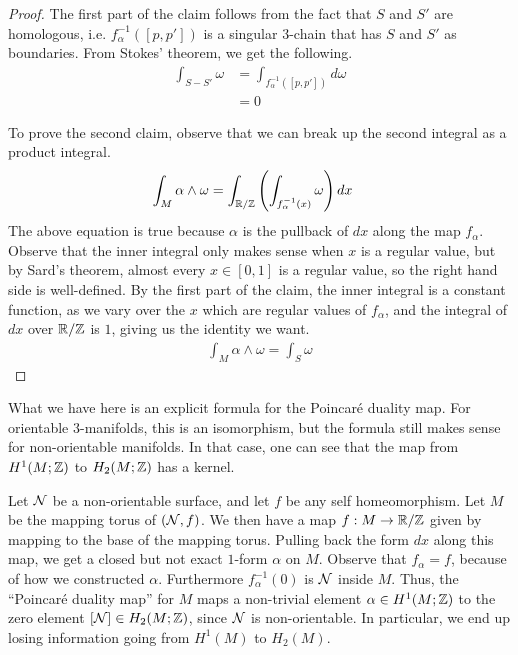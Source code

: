 \begin{proof}
  The first part of the claim follows from the fact that $S$ and $S'$ are homologous, i.e. $f^{-1}_{\alpha}([p, p'])$
  is a singular $3$-chain that has $S$ and $S'$ as boundaries. From Stokes' theorem, we get the following.
  \begin{align*}
    \int_{S - S'} \omega &= \int_{f_{\alpha}^{-1}([p, p'])} d\omega \\
                         &= 0
  \end{align*}

  To prove the second claim, observe that we can break up the second integral as a product integral.
  \begin{align*}
    \int_M \alpha \wedge \omega &= \int_{\mathbb{R}/\mathbb{Z}} \left(   \int_{f_{\alpha}^{-1}(x)} \omega \right) dx
  \end{align*}
  The above equation is true because $\alpha$ is the pullback of $dx$ along the map $f_{\alpha}$. Observe
  that the inner integral only makes sense when $x$ is a regular value, but by Sard's theorem, almost
  every $x \in [0,1]$ is a regular value, so the right hand side is well-defined. By the first part of the
  claim, the inner integral is a constant function, as we vary over the $x$ which are regular values of $f_{\alpha}$,
  and the integral of $dx$ over $\mathbb{R}/\mathbb{Z}$ is $1$, giving us the identity we want.
  \begin{align*}
    \int_M \alpha \wedge \omega = \int_S \omega
  \end{align*}
\end{proof}
What we have here is an explicit formula for the Poincar\'e duality map. For orientable $3$-manifolds, this
is an isomorphism, but the formula still makes sense for non-orientable manifolds. In that case, one can see
that the map from $H^1(M; \mathbb{Z})$ to $H_2(M; \mathbb{Z})$ has a kernel.
\begin{example}
  Let $\mathcal{N}$ be a non-orientable surface, and let $f$ be any self homeomorphism. Let $M$ be the mapping torus
  of $(\mathcal{N}, f)$. We then have a map $f: M \to \mathbb{R}/\mathbb{Z}$ given by mapping to the base of the mapping torus.
  Pulling back the form $dx$ along this map, we get a closed but not exact $1$-form $\alpha$ on $M$. Observe
  that $f_{\alpha} = f$, because of how we constructed $\alpha$. Furthermore $f_{\alpha}^{-1}(0)$ is $\mathcal{N}$ inside
  $M$. Thus, the ``Poincar\'e duality map'' for $M$ maps a non-trivial element $\alpha \in H^1(M; \mathbb{Z})$ to the
  zero element $[\mathcal{N}] \in H_2(M; \mathbb{Z})$, since $\mathcal{N}$ is non-orientable. In particular, we end up losing information
  going from $H^1(M)$ to $H_2(M)$.
\end{example}


